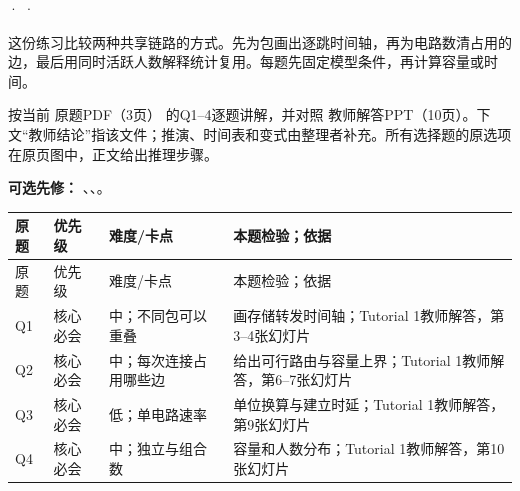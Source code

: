


 ·  · 


这份练习比较两种共享链路的方式。先为包画出逐跳时间轴，再为电路数清占用的边，最后用同时活跃人数解释统计复用。每题先固定模型条件，再计算容量或时间。

按当前 原题PDF（3页） 的Q1–4逐题讲解，并对照 教师解答PPT（10页）。下文“教师结论”指该文件；推演、时间表和变式由整理者补充。所有选择题的原选项在原页图中，正文给出推理步骤。


\textbf{可选先修：} 、、。


\begingroup
\small\setlength{\tabcolsep}{3pt}
\renewcommand{\arraystretch}{1.22}
\begin{longtable}{@{}>{\raggedright\arraybackslash}p{}>{\raggedright\arraybackslash}p{}>{\raggedright\arraybackslash}p{}>{\raggedright\arraybackslash}p{}@{}}
\toprule
原题 & 优先级 & 难度/卡点 & 本题检验；依据 \\
\midrule\endfirsthead
原题 & 优先级 & 难度/卡点 & 本题检验；依据 \\
\midrule\endhead
\bottomrule\endfoot
Q1 & 核心必会 & 中；不同包可以重叠 & 画存储转发时间轴；Tutorial 1教师解答，第3–4张幻灯片 \\
Q2 & 核心必会 & 中；每次连接占用哪些边 & 给出可行路由与容量上界；Tutorial 1教师解答，第6–7张幻灯片 \\
Q3 & 核心必会 & 低；单电路速率 & 单位换算与建立时延；Tutorial 1教师解答，第9张幻灯片 \\
Q4 & 核心必会 & 中；独立与组合数 & 容量和人数分布；Tutorial 1教师解答，第10张幻灯片 \\
\end{longtable}
\endgroup







